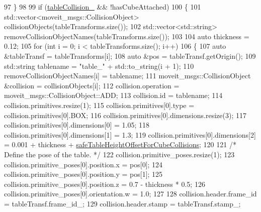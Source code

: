 \begin{DoxyCode}
97                     \}
98 
99                     \textcolor{keywordflow}{if} (\hyperlink{classsm__moveit__4_1_1cl__perception__system_1_1CpSimulatedGazeboPerception_a64beecc85d97c62bc4f884f4601d9c6a}{tableCollision\_} && !hasCubeAttached)
100                     \{
101                         std::vector<moveit\_msgs::CollisionObject> collisionObjects(tableTransforms.size());
102                         std::vector<std::string> removeCollisionObjectNames(tableTransforms.size());
103 
104                         \textcolor{keyword}{auto} thickness = 0.12;
105                         \textcolor{keywordflow}{for} (\textcolor{keywordtype}{int} i = 0; i < tableTransforms.size(); i++)
106                         \{
107                             \textcolor{keyword}{auto} &tableTransf = tableTransforms[i];
108                             \textcolor{keyword}{auto} &pos = tableTransf.getOrigin();
109                             std::string tablename = \textcolor{stringliteral}{"table\_"} + std::to\_string(i + 1);
110                             removeCollisionObjectNames[i] = tablename;
111                             moveit\_msgs::CollisionObject &collision = collisionObjects[i];
112                             collision.operation = moveit\_msgs::CollisionObject::ADD;
113                             collision.id = tablename;
114                             collision.primitives.resize(1);
115                             collision.primitives[0].type = collision.primitives[0].BOX;
116                             collision.primitives[0].dimensions.resize(3);
117                             collision.primitives[0].dimensions[0] = 1.05;
118                             collision.primitives[0].dimensions[1] = 1.3;
119                             collision.primitives[0].dimensions[2] = 0.001 + thickness + 
      \hyperlink{classsm__moveit__4_1_1cl__perception__system_1_1CpSimulatedGazeboPerception_a6b6bafbddde1f72c81bf54aa75872151}{safeTableHeightOffsetForCubeCollisions};
120 
121                             \textcolor{comment}{/* Define the pose of the table. */}
122                             collision.primitive\_poses.resize(1);
123                             collision.primitive\_poses[0].position.x = pos[0];
124                             collision.primitive\_poses[0].position.y = pos[1];
125                             collision.primitive\_poses[0].position.z = 0.7 - thickness * 0.5;
126                             collision.primitive\_poses[0].orientation.w = 1.0;
127 
128                             collision.header.frame\_id = tableTransf.frame\_id\_;
129                             collision.header.stamp = tableTransf.stamp\_;

\end{DoxyCode}
